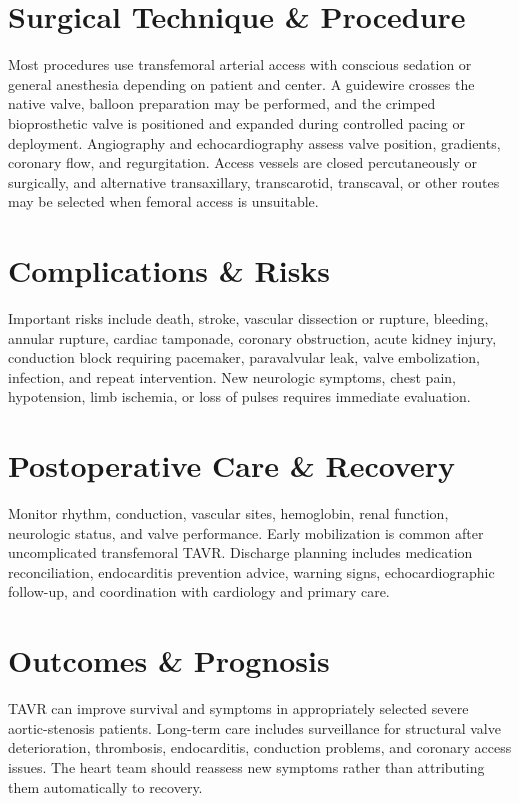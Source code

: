 \section*{Surgical Technique \& Procedure}
Most procedures use transfemoral arterial access with conscious sedation or general anesthesia depending on patient and center. A guidewire crosses the native valve, balloon preparation may be performed, and the crimped bioprosthetic valve is positioned and expanded during controlled pacing or deployment. Angiography and echocardiography assess valve position, gradients, coronary flow, and regurgitation. Access vessels are closed percutaneously or surgically, and alternative transaxillary, transcarotid, transcaval, or other routes may be selected when femoral access is unsuitable.

\section*{Complications \& Risks}
Important risks include death, stroke, vascular dissection or rupture, bleeding, annular rupture, cardiac tamponade, coronary obstruction, acute kidney injury, conduction block requiring pacemaker, paravalvular leak, valve embolization, infection, and repeat intervention. New neurologic symptoms, chest pain, hypotension, limb ischemia, or loss of pulses requires immediate evaluation.

\section*{Postoperative Care \& Recovery}
Monitor rhythm, conduction, vascular sites, hemoglobin, renal function, neurologic status, and valve performance. Early mobilization is common after uncomplicated transfemoral TAVR. Discharge planning includes medication reconciliation, endocarditis prevention advice, warning signs, echocardiographic follow-up, and coordination with cardiology and primary care.

\section*{Outcomes \& Prognosis}
TAVR can improve survival and symptoms in appropriately selected severe aortic-stenosis patients. Long-term care includes surveillance for structural valve deterioration, thrombosis, endocarditis, conduction problems, and coronary access issues. The heart team should reassess new symptoms rather than attributing them automatically to recovery.

